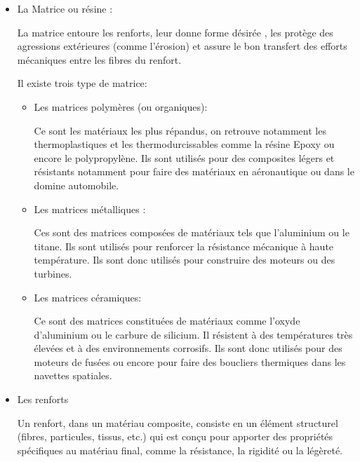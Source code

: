 \begin{itemize}

    \item
    La Matrice ou résine :


    La matrice entoure les renforts, leur donne forme désirée , les protège des agressions extérieures (comme l’érosion) et assure le bon transfert des efforts mécaniques entre les fibres du renfort.


    Il existe trois type de matrice:


    \begin{itemize}

        \item
        Les matrices polymères (ou organiques):


        Ce sont les matériaux les plus répandus, on retrouve notamment les thermoplastiques et les thermodurcissables comme la résine Epoxy ou encore le polypropylène. Ils sont utilisés pour des composites légers et résistants notamment pour faire des matériaux en aéronautique ou dans le domine automobile.




        \item
        Les matrices métalliques :


        Ces sont des matrices composées de matériaux tels que l’aluminium ou le titane. Ils sont utilisés pour renforcer la résistance mécanique à haute température. Ils sont donc utilisés pour construire des moteurs ou des turbines.




        \item
        Les matrices céramiques:


        Ce sont des matrices constituées de matériaux comme l'oxyde d'aluminium ou le carbure de silicium. Il résistent à des températures très élevées et à des environnements corrosifs. Ils sont donc utilisés pour des moteurs de fusées ou encore pour faire des boucliers thermiques dans les navettes spatiales.


    \end{itemize}



    \item
    Les renforts


    Un renfort, dans un matériau composite, consiste en un élément structurel (fibres, particules, tissus, etc.) qui est conçu pour apporter des propriétés spécifiques au matériau final, comme la résistance, la rigidité ou la légèreté.



\end{itemize}
